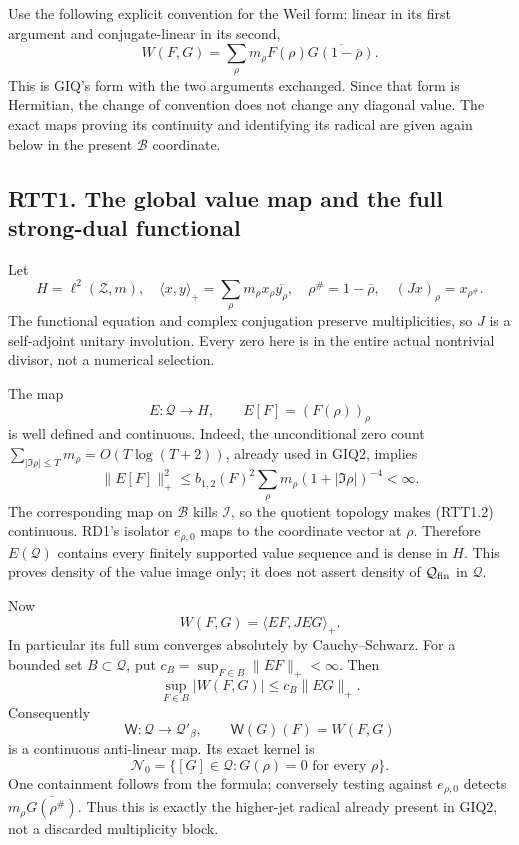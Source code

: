 Use the following explicit convention for the Weil form: linear in its
first argument and conjugate-linear in its second, \[
W(F,G)=\sum_\rho m_\rho F(\rho)\overline{G(1-\overline\rho)}.
\tag{RTT0.4}
\] This is GIQ's form with the two arguments exchanged. Since that form
is Hermitian, the change of convention does not change any diagonal
value. The exact maps proving its continuity and identifying its radical
are given again below in the present \(\mathcal B\) coordinate.

\subsection{RTT1. The global value map and the full strong-dual
functional}\label{rtt1.-the-global-value-map-and-the-full-strong-dual-functional}

Let \[
H=\ell^2(\mathscr Z,m),\quad
\langle x,y\rangle_+=\sum_\rho m_\rho x_\rho\overline{y_\rho},
\quad \rho^\#=1-\overline\rho,\quad (Jx)_\rho=x_{\rho^\#}.
\tag{RTT1.1}
\] The functional equation and complex conjugation preserve
multiplicities, so \(J\) is a self-adjoint unitary involution. Every
zero here is in the entire actual nontrivial divisor, not a numerical
selection.

The map \[
E:\mathcal Q\longrightarrow H,\qquad E[F]=(F(\rho))_\rho
\tag{RTT1.2}
\] is well defined and continuous. Indeed, the unconditional zero count
\(\sum_{|\Im\rho|\le T}m_\rho=O(T\log(T+2))\), already used in GIQ2,
implies \[
\|E[F]\|_+^2\le b_{1,2}(F)^2
\sum_\rho m_\rho(1+|\Im\rho|)^{-4}<\infty.
\tag{RTT1.3}
\] The corresponding map on \(\mathcal B\) kills \(\mathcal I\), so the
quotient topology makes (RTT1.2) continuous. RD1's isolator
\(e_{\rho,0}\) maps to the coordinate vector at \(\rho\). Therefore
\(E(\mathcal Q)\) contains every finitely supported value sequence and
is dense in \(H\). This proves density of the value image only; it does
not assert density of \(\mathcal Q_{\rm fin}\) in \(\mathcal Q\).

Now \[
W(F,G)=\langle EF,JEG\rangle_+.
\tag{RTT1.4}
\] In particular its full sum converges absolutely by Cauchy--Schwarz.
For a bounded set \(B\subset\mathcal Q\), put
\(c_B=\sup_{F\in B}\|EF\|_+<\infty\). Then \[
\sup_{F\in B}|W(F,G)|\le c_B\|EG\|_+.
\tag{RTT1.5}
\] Consequently \[
\mathsf W:\mathcal Q\longrightarrow\mathcal Q'_\beta,
\qquad \mathsf W(G)(F)=W(F,G)
\tag{RTT1.6}
\] is a continuous anti-linear map. Its exact kernel is \[
\mathcal N_0=\{[G]\in\mathcal Q:G(\rho)=0\text{ for every }\rho\}.
\tag{RTT1.7}
\] One containment follows from the formula; conversely testing against
\(e_{\rho,0}\) detects \(m_\rho\overline{G(\rho^\#)}\). Thus this is
exactly the higher-jet radical already present in GIQ2, not a discarded
multiplicity block.

